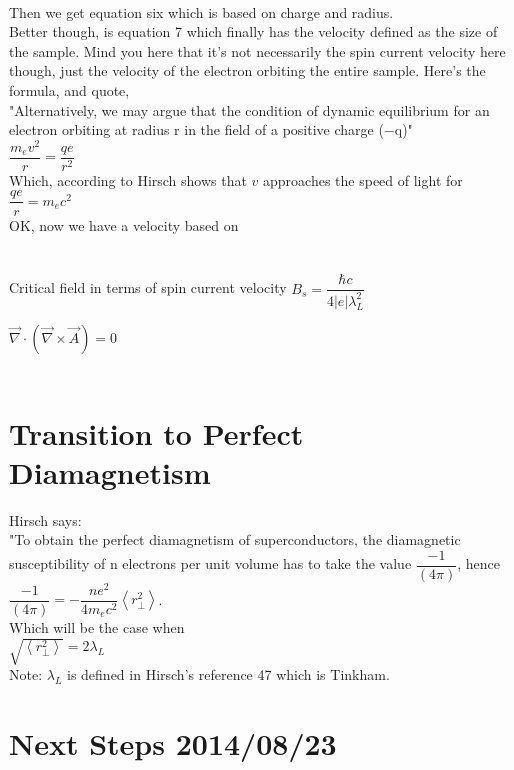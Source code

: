 \documentclass[prb,preprint]
{revtex4-1}
\begin{document}
\\
Then we get equation six which is based on charge and radius.
\\
Better though, is equation 7 which finally has the velocity defined as the size of the sample.  Mind you here that it's not necessarily the spin current velocity here though, just the velocity of the electron orbiting the entire sample.  Here's the formula, and quote, 
\\
"Alternatively, we may argue that the condition of dynamic equilibrium for an electron
orbiting at radius r in the field of a positive charge (−q)"
\\
$\dfrac{m_e v^2}{r} = \dfrac{qe}{r^2}$
\\
Which, according to Hirsch shows that $v$ approaches the speed of light for $\dfrac{q e }{r} = m_e c^2$
\\
OK, now we have a velocity based on 
\\\\\\
Critical field in terms of spin current velocity
$B_s = \dfrac{\hbar c}{4 | e | \lambda_L^2}$


$\vec{\nabla} \cdot \left(\vec{\nabla} \times \vec{A} \right) = 0$
\\
\\





\newpage
\section{Transition to Perfect Diamagnetism}
\bigskip

Hirsch says:
\\
"To obtain the perfect diamagnetism of superconductors, the diamagnetic susceptibility of n electrons per unit volume has to take the value $\dfrac{-1}{\left(4\pi\right)}$, hence
\\
$\dfrac{-1}{\left(4\pi\right)} = -\dfrac{n e^2}{4 m_e c^2} \left< r_\perp^2 \right>$.
\\
Which will be the case when \\
$\sqrt{\left< r_\perp^2 \right>} = 2\lambda_L$
\\
Note:  $\lambda_L$ is defined in Hirsch's reference 47 which is Tinkham.

\newpage
\section{Next Steps 2014/08/23}
\bigskip
\end{document}
